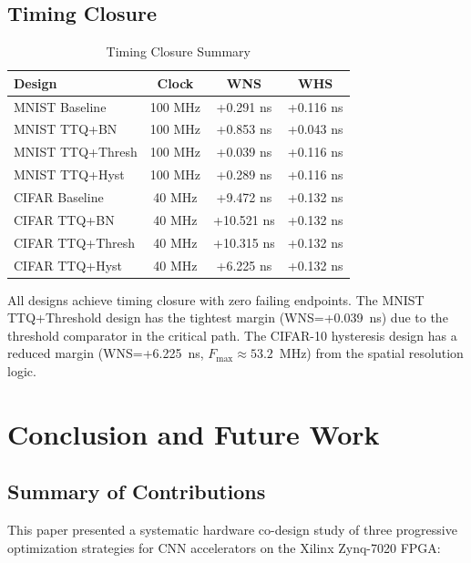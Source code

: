 \documentclass[conference]{IEEEtran}
\begin{document}
\subsection{Timing Closure}

\begin{table}[H]
\centering
\caption{Timing Closure Summary}
\label{tab:timing}
\begin{tabular}{lccc}
\toprule
\textbf{Design} & \textbf{Clock} & \textbf{WNS} & \textbf{WHS} \\
\midrule
MNIST Baseline & 100 MHz & +0.291 ns & +0.116 ns \\
MNIST TTQ+BN & 100 MHz & +0.853 ns & +0.043 ns \\
MNIST TTQ+Thresh & 100 MHz & +0.039 ns & +0.116 ns \\
MNIST TTQ+Hyst & 100 MHz & +0.289 ns & +0.116 ns \\
\midrule
CIFAR Baseline & 40 MHz & +9.472 ns & +0.132 ns \\
CIFAR TTQ+BN & 40 MHz & +10.521 ns & +0.132 ns \\
CIFAR TTQ+Thresh & 40 MHz & +10.315 ns & +0.132 ns \\
CIFAR TTQ+Hyst & 40 MHz & +6.225 ns & +0.132 ns \\
\bottomrule
\end{tabular}
\end{table}

All designs achieve timing closure with zero failing endpoints. The MNIST TTQ+Threshold design has the tightest margin (WNS=+0.039~ns) due to the threshold comparator in the critical path. The CIFAR-10 hysteresis design has a reduced margin (WNS=+6.225~ns, $F_{\text{max}} \approx 53.2$~MHz) from the spatial resolution logic.


\section{Conclusion and Future Work}
\label{sec:conclusion}

\subsection{Summary of Contributions}

This paper presented a systematic hardware co-design study of three progressive optimization strategies for CNN accelerators on the Xilinx Zynq-7020 FPGA:
\end{document}
